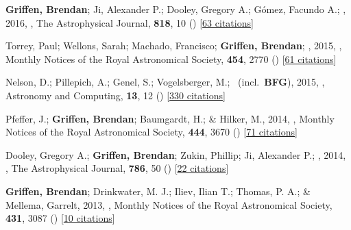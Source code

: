 \item[{\color{numcolor}\scriptsize8}] \textbf{Griffen, Brendan}; Ji, Alexander P.; Dooley, Gregory A.; G{\'o}mez, Facundo A.; \etal, 2016, , The Astrophysical Journal, \textbf{818}, 10 () [\href{https://ui.adsabs.harvard.edu/abs/2016ApJ...818...10G}{63 citations}]

\item[{\color{numcolor}\scriptsize7}] Torrey, Paul; Wellons, Sarah; Machado, Francisco; \textbf{Griffen, Brendan}; \etal, 2015, , Monthly Notices of the Royal Astronomical Society, \textbf{454}, 2770 () [\href{https://ui.adsabs.harvard.edu/abs/2015MNRAS.454.2770T}{61 citations}]

\item[{\color{numcolor}\scriptsize6}] Nelson, D.; Pillepich, A.; Genel, S.; Vogelsberger, M.; \etal\ (incl.\ \textbf{BFG}), 2015, , Astronomy and Computing, \textbf{13}, 12 () [\href{https://ui.adsabs.harvard.edu/abs/2015A&C....13...12N}{330 citations}]

\item[{\color{numcolor}\scriptsize5}] Pfeffer, J.; \textbf{Griffen, Brendan}; Baumgardt, H.; \& Hilker, M., 2014, , Monthly Notices of the Royal Astronomical Society, \textbf{444}, 3670 () [\href{https://ui.adsabs.harvard.edu/abs/2014MNRAS.444.3670P}{71 citations}]

\item[{\color{numcolor}\scriptsize4}] Dooley, Gregory A.; \textbf{Griffen, Brendan}; Zukin, Phillip; Ji, Alexander P.; \etal, 2014, , The Astrophysical Journal, \textbf{786}, 50 () [\href{https://ui.adsabs.harvard.edu/abs/2014ApJ...786...50D}{22 citations}]

\item[{\color{numcolor}\scriptsize3}] \textbf{Griffen, Brendan}; Drinkwater, M. J.; Iliev, Ilian T.; Thomas, P. A.; \& Mellema, Garrelt, 2013, , Monthly Notices of the Royal Astronomical Society, \textbf{431}, 3087 () [\href{https://ui.adsabs.harvard.edu/abs/2013MNRAS.431.3087G}{10 citations}]

